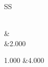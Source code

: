 \begin{longtable}{SS}
\caption{The first table}\label{}\\
\toprule
{}	&	\\
	&2.000	\\\hline

1.000	&4.000	\\

\bottomrule
\end{longtable}